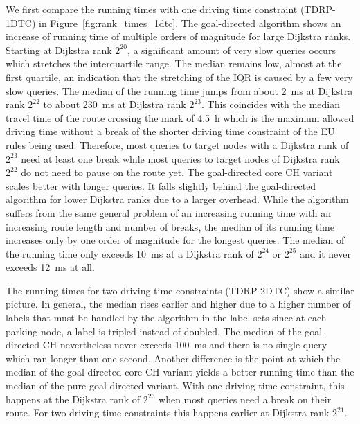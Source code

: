 We first compare the running times with one driving time constraint (TDRP-1DTC) in Figure~\ref{fig:rank_times_1dtc}. The goal-directed algorithm shows an increase of running time of multiple orders of magnitude for large Dijkstra ranks. Starting at Dijkstra rank $2^{20}$, a significant amount of very slow queries occurs which stretches the interquartile range. The median remains low, almost at the first quartile, an indication that the stretching of the IQR is caused by a few very slow queries. The median of the running time jumps from about \SI{2}{\milli\second} at Dijkstra rank $2^{22}$ to about \SI{230}{\milli\second} at Dijkstra rank $2^{23}$. This coincides with the median travel time of the route crossing the mark of \SI{4.5}{\hour} which is the maximum allowed driving time without a break of the shorter driving time constraint of the EU rules being used. Therefore, most queries to target nodes with a Dijkstra rank of $2^{23}$ need at least one break while most queries to target nodes of Dijkstra rank  $2^{22}$ do not need to pause on the route yet. The goal-directed core CH variant scales better with longer queries. It falls slightly behind the goal-directed algorithm for lower Dijkstra ranks due to a larger overhead. While the algorithm suffers from the same general problem of an increasing running time with an increasing route length and number of breaks, the median of its running time increases only by one order of magnitude for the longest queries. The median of the running time only exceeds \SI{10}{\milli\second} at a Dijkstra rank of $2^{24}$ or $2^{25}$ and it never exceeds \SI{12}{\milli\second} at all.

The running times for two driving time constraints (TDRP-2DTC) show a similar picture. In general, the median rises earlier and higher due to a higher number of labels that must be handled by the algorithm in the label sets since at each parking node, a label is tripled instead of doubled. The median of the goal-directed CH nevertheless never exceeds \SI{100}{\milli\second} and there is no single query which ran longer than one second. Another difference is the point at which the median of the goal-directed core CH variant yields a better running time than the median of the pure goal-directed variant. With one driving time constraint, this happens at the Dijkstra rank of $2^{23}$ when most queries need a break on their route. For two driving time constraints this happens earlier at Dijkstra rank $2^{21}$.

